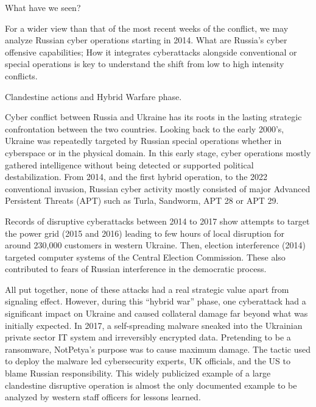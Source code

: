 What have we seen?

For a wider view than that of the most recent weeks of the conflict, we may analyze Russian cyber operations starting in 2014. What are Russia’s cyber offensive capabilities; How it integrates cyberattacks alongside conventional or special operations is key to understand the shift from low to high intensity conflicts.

Clandestine actions and Hybrid Warfare phase.

Cyber conflict between Russia and Ukraine has its roots in the lasting strategic confrontation between the two countries. Looking back to the early 2000’s, Ukraine was repeatedly targeted by Russian special operations whether in cyberspace or in the physical domain. In this early stage, cyber operations mostly gathered intelligence without being detected or supported political destabilization. From 2014, and the first hybrid operation, to the 2022 conventional invasion, Russian cyber activity mostly consisted of major Advanced Persistent Threats (APT) such as Turla, Sandworm, APT 28 or APT 29. 

Records of disruptive cyberattacks between 2014 to 2017 show attempts to target the power grid (2015 and 2016) leading to few hours of local disruption for around 230,000 customers in western Ukraine. Then, election interference (2014) targeted computer systems of the Central Election Commission. These also contributed to fears of Russian interference in the democratic process.

All put together, none of these attacks had a real strategic value apart from signaling effect. However, during this “hybrid war” phase, one cyberattack had a significant impact on Ukraine and caused collateral damage far beyond what was initially expected. In 2017, a self-spreading malware sneaked into the Ukrainian private sector IT system and irreversibly encrypted data. Pretending to be a ransomware, NotPetya’s purpose was to cause maximum damage. The tactic used to deploy the malware led cybersecurity experts, UK officials, and the US to blame Russian responsibility. This widely publicized example of a large clandestine disruptive operation is almost the only documented example to be analyzed by western staff officers for lessons learned. 

